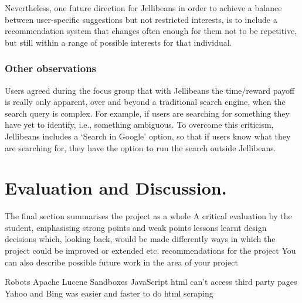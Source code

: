 \documentclass[a4paper, 11pt]{article}
\begin{document}
\vspace{5mm}
Nevertheless, one future direction for Jellibeans in order to achieve a balance between user-specific suggestions but not restricted interests, is to include a recommendation system that changes often enough for them not to be repetitive, but still within a range of possible interests for that individual. 

\subsubsection{Other observations}

Users agreed during the focus group that with Jellibeans the time/reward payoff is really only apparent, over and beyond a traditional search engine, when the search query is complex. For example, if users are searching for something they have yet to identify, i.e., something ambiguous. To overcome this criticism, Jellibeans includes a `Search in Google' option, so that if users know what they are searching for, they have the option to run the search outside Jellibeans.

\section{Evaluation and Discussion.}\label{eval}


The final section summarises the project as a whole
A critical evaluation by the student, emphasising
strong points and weak points
lessons learnt
design decisions which, looking back, would be made differently
ways in which the project could be improved or extended etc.
recommendations for the project
You can also describe possible future work in the area of your project




Robots
Apache Lucene
Sandboxes
JavaScript html can't access third party pages
Yahoo and Bing was easier and faster to do html scraping
\end{document}
